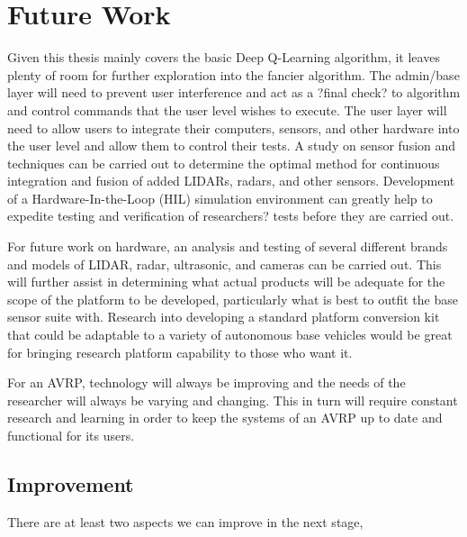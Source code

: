 \chapter{Future Work}

Given this thesis mainly covers the basic Deep Q-Learning algorithm, it leaves plenty of room for further exploration into the fancier algorithm. The admin/base layer will need to prevent user interference and act as a ?final check? to algorithm and control commands that the user level wishes to execute. The user layer will need to allow users to integrate their computers, sensors, and other hardware into the user level and allow them to control their tests. A study on sensor fusion and techniques can be carried out to determine the optimal method for continuous integration and fusion of added LIDARs, radars, and other sensors. Development of a Hardware-In-the-Loop (HIL) simulation environment can greatly help to expedite testing and verification of researchers? tests before they are carried out.

For future work on hardware, an analysis and testing of several different brands and models of LIDAR, radar, ultrasonic, and cameras can be carried out. This will further assist in determining what actual products will be adequate for the scope of the platform to be developed, particularly what is best to outfit the base sensor suite with. Research into developing a standard platform conversion kit that could be adaptable to a variety of autonomous base vehicles would be great for bringing research platform capability to those who want it.

For an AVRP, technology will always be improving and the needs of the researcher will always be varying and changing. This in turn will require constant research and learning in order to keep the systems of an AVRP up to date and functional for its users.

\section{Improvement}

There are at least two aspects we can improve in the next stage,

